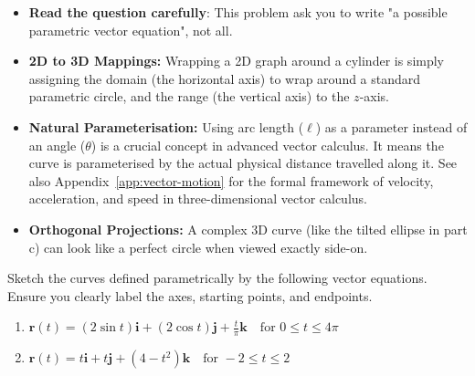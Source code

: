 \begin{takeaways}
\begin{itemize}[leftmargin=*]
    \item \textbf{Read the question carefully}: This problem ask you to write "a possible parametric vector equation", not all.
    \item \textbf{2D to 3D Mappings:} Wrapping a 2D graph around a cylinder is simply assigning the domain (the horizontal axis) to wrap around a standard parametric circle, and the range (the vertical axis) to the $z$-axis.
    \item \textbf{Natural Parameterisation:} Using arc length ($\ell$) as a parameter instead of an angle ($\theta$) is a crucial concept in advanced vector calculus. It means the curve is parameterised by the actual physical distance travelled along it. See also Appendix~\ref{app:vector-motion} for the formal framework of velocity, acceleration, and speed in three-dimensional vector calculus.
    \item \textbf{Orthogonal Projections:} A complex 3D curve (like the tilted ellipse in part c) can look like a perfect circle when viewed exactly side-on. 
\end{itemize}
\end{takeaways}

\vspace{1em}


\begin{problem}
\begin{minipage}{0.55\textwidth}
Sketch the curves defined parametrically by the following vector equations. Ensure you clearly label the axes, starting points, and endpoints.
\begin{enumerate}
    \item[\textbf{(a)}] $\mathbf{r}(t) = (2\sin t)\mathbf{i} + (2\cos t)\mathbf{j} + \frac{t}{\pi}\mathbf{k} \quad \text{for } 0 \le t \le 4\pi$
    \item[\textbf{(b)}] $\mathbf{r}(t) = t\mathbf{i} + t\mathbf{j} + (4 - t^2)\mathbf{k} \quad \text{for } -2 \le t \le 2$
\end{enumerate}
\end{minipage}%
\hfill
\begin{minipage}{0.4\textwidth}
\begin{center}
\end{center}
\end{minipage}
\end{problem}

